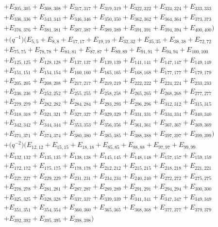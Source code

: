 \documentclass[10pt,a4paper]{amsart}
\numberwithin{equation}{section}
\theoremstyle{definition}
\begin{document}
\begin{align*}
&+E_{305,305}+E_{308,308}+E_{317,317}+E_{319,319}+E_{322,322}+E_{324,324}+E_{333,333}\\
&+E_{336,336}+E_{343,343}+E_{346,346}+E_{350,350}+E_{362,362}+E_{364,364}+E_{373,373}\\
&+E_{376,376}+E_{381,381}+E_{387,387}+E_{389,389}+E_{391,391}+E_{394,394}+E_{400,400})\\
&+\bigl(q^{-1}\bigr)(E_{5,5}+E_{8,8}+E_{17,17}+E_{19,19}+E_{32,32}+E_{35,35}+E_{38,38}+E_{72,72}\\
&+E_{75,75}+E_{78,78}+E_{81,81}+E_{87,87}+E_{89,89}+E_{91,91}+E_{94,94}+E_{100,100}\\
&+E_{125,125}+E_{128,128}+E_{137,137}+E_{139,139}+E_{141,141}+E_{147,147}+E_{149,149}\\
&+E_{151,151}+E_{154,154}+E_{160,160}+E_{165,165}+E_{168,168}+E_{177,177}+E_{179,179}\\
&+E_{205,205}+E_{208,208}+E_{217,217}+E_{219,219}+E_{222,222}+E_{224,224}+E_{233,233}\\
&+E_{236,236}+E_{252,252}+E_{255,255}+E_{258,258}+E_{265,265}+E_{268,268}+E_{277,277}\\
&+E_{279,279}+E_{282,282}+E_{284,284}+E_{293,293}+E_{296,296}+E_{312,312}+E_{315,315}\\
&+E_{318,318}+E_{321,321}+E_{327,327}+E_{329,329}+E_{331,331}+E_{334,334}+E_{340,340}\\
&+E_{342,342}+E_{344,344}+E_{353,353}+E_{356,356}+E_{361,361}+E_{367,367}+E_{369,369}\\
&+E_{371,371}+E_{374,374}+E_{380,380}+E_{385,385}+E_{388,388}+E_{397,397}+E_{399,399})\\
&+\bigl(q^{-2}\bigr)(E_{12,12}+E_{15,15}+E_{18,18}+E_{85,85}+E_{88,88}+E_{97,97}+E_{99,99}\\
&+E_{132,132}+E_{135,135}+E_{138,138}+E_{145,145}+E_{148,148}+E_{157,157}+E_{159,159}\\
&+E_{172,172}+E_{175,175}+E_{178,178}+E_{212,212}+E_{215,215}+E_{218,218}+E_{221,221}\\
&+E_{227,227}+E_{229,229}+E_{231,231}+E_{234,234}+E_{240,240}+E_{272,272}+E_{275,275}\\
&+E_{278,278}+E_{281,281}+E_{287,287}+E_{289,289}+E_{291,291}+E_{294,294}+E_{300,300}\\
&+E_{325,325}+E_{328,328}+E_{337,337}+E_{339,339}+E_{341,341}+E_{347,347}+E_{349,349}\\
&+E_{351,351}+E_{354,354}+E_{360,360}+E_{365,365}+E_{368,368}+E_{377,377}+E_{379,379}\\
&+E_{392,392}+E_{395,395}+E_{398,398})\\

\end{align*}
\end{document}
